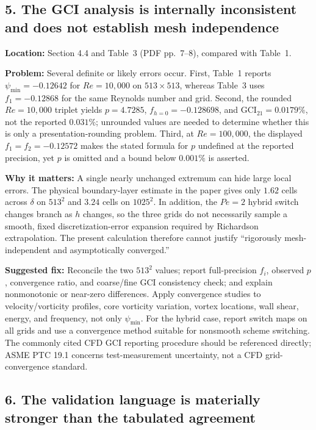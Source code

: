 \documentclass[11pt]{article}
\newcommand{\location}[1]{\textbf{Location:} #1\par}
\newcommand{\problem}[1]{\textbf{Problem:} #1\par}
\newcommand{\impact}[1]{\textbf{Why it matters:} #1\par}
\newcommand{\fixit}[1]{\textbf{Suggested fix:} #1\par}
\begin{document}
\subsection*{5. The GCI analysis is internally inconsistent and does not establish mesh independence}

\location{Section 4.4 and Table~3 (PDF pp.~7--8), compared with Table~1.}
\problem{Several definite or likely errors occur.  First, Table~1 reports $\psi_{\min}=-0.12642$ for $Re=10{,}000$ on $513\times513$, whereas Table~3 uses $f_1=-0.12868$ for the same Reynolds number and grid.  Second, the rounded $Re=10{,}000$ triplet yields $p=4.7285$, $f_{h=0}=-0.128698$, and $\mathrm{GCI}_{21}=0.0179\%$, not the reported $0.031\%$; unrounded values are needed to determine whether this is only a presentation-rounding problem.  Third, at $Re=100{,}000$, the displayed $f_1=f_2=-0.12572$ makes the stated formula for $p$ undefined at the reported precision, yet $p$ is omitted and a bound below $0.001\%$ is asserted.}
\impact{A single nearly unchanged extremum can hide large local errors.  The physical boundary-layer estimate in the paper gives only $1.62$ cells across $\delta$ on $513^2$ and $3.24$ cells on $1025^2$.  In addition, the $Pe=2$ hybrid switch changes branch as $h$ changes, so the three grids do not necessarily sample a smooth, fixed discretization-error expansion required by Richardson extrapolation.  The present calculation therefore cannot justify ``rigorously mesh-independent and asymptotically converged.''}
\fixit{Reconcile the two $513^2$ values; report full-precision $f_i$, observed $p$, convergence ratio, and coarse/fine GCI consistency check; and explain nonmonotonic or near-zero differences.  Apply convergence studies to velocity/vorticity profiles, core vorticity variation, vortex locations, wall shear, energy, and frequency, not only $\psi_{\min}$.  For the hybrid case, report switch maps on all grids and use a convergence method suitable for nonsmooth scheme switching.  The commonly cited CFD GCI reporting procedure should be referenced directly; ASME PTC 19.1 concerns test-measurement uncertainty, not a CFD grid-convergence standard.}

\subsection*{6. The validation language is materially stronger than the tabulated agreement}
\end{document}
